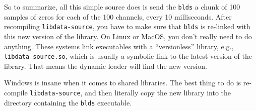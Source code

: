 \documentclass[12pt]{article}
\begin{document}
So to summarize, all this simple source does is send the \texttt{blds} a chunk
of 100 samples of zeros for each of the 100 channels, every 10 milliseconds. After
recompiling \texttt{libdata-source}, you have to make sure that \texttt{blds}
is re-linked with this new version of the library. On Linux or MacOS, you don't really
need to do anything. These systems link executables with a ``versionless''
library, e.g., \texttt{libdata-source.so}, which is usually a symbolic link
to the latest version of the library. That means the dynamic loader will
find the new version.

Windows is insane when it comes to shared libraries. The best thing to do is
re-compile \texttt{libdata-source}, and then literally copy the new library into
the directory containing the \texttt{blds} executable.
\end{document}
